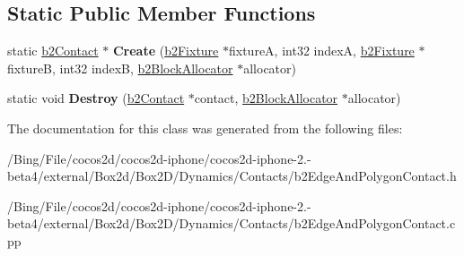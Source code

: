 \subsection*{Static Public Member Functions}
\begin{DoxyCompactItemize}
\item 
\hypertarget{classb2_edge_and_polygon_contact_a3a0bcb2327e02bfc2079a734d8e9c8f7}{static \hyperlink{classb2_contact}{b2\-Contact} $\ast$ {\bfseries Create} (\hyperlink{classb2_fixture}{b2\-Fixture} $\ast$fixture\-A, int32 index\-A, \hyperlink{classb2_fixture}{b2\-Fixture} $\ast$fixture\-B, int32 index\-B, \hyperlink{classb2_block_allocator}{b2\-Block\-Allocator} $\ast$allocator)}\label{classb2_edge_and_polygon_contact_a3a0bcb2327e02bfc2079a734d8e9c8f7}

\item 
\hypertarget{classb2_edge_and_polygon_contact_a83260c190706928518ab1a3040c0c515}{static void {\bfseries Destroy} (\hyperlink{classb2_contact}{b2\-Contact} $\ast$contact, \hyperlink{classb2_block_allocator}{b2\-Block\-Allocator} $\ast$allocator)}\label{classb2_edge_and_polygon_contact_a83260c190706928518ab1a3040c0c515}

\end{DoxyCompactItemize}


The documentation for this class was generated from the following files\-:\begin{DoxyCompactItemize}
\item 
/\-Bing/\-File/cocos2d/cocos2d-\/iphone/cocos2d-\/iphone-\/2.-\/beta4/external/\-Box2d/\-Box2\-D/\-Dynamics/\-Contacts/b2\-Edge\-And\-Polygon\-Contact.\-h\item 
/\-Bing/\-File/cocos2d/cocos2d-\/iphone/cocos2d-\/iphone-\/2.-\/beta4/external/\-Box2d/\-Box2\-D/\-Dynamics/\-Contacts/b2\-Edge\-And\-Polygon\-Contact.\-cpp\end{DoxyCompactItemize}
